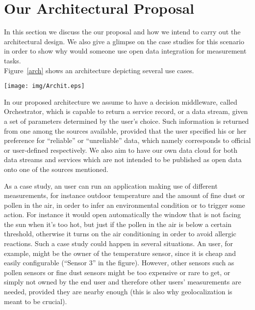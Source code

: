 \section{Our Architectural Proposal}
\label{sec:casestudy}
In this section we discuss the our proposal and how we intend to carry out the architectural design.
We also give a glimpse on the case studies for this scenario in order to show why would someone use open data integration for measurement tasks.
\\
Figure~\ref{arch} shows an architecture depicting several use cases.

\begin{figure*}[!t]
\centering
\texttt{[image: img/Archit.eps]} 
\caption{}
\label{arch}
\end{figure*}

In our proposed architecture we assume to have a decision middleware, called Orchestrator, which is capable to return a service record, or a data stream, given a set of parameters determined by the user's choice.
Such information is returned from one among the sources available, provided that the user specified his or her preference for ``reliable'' or ``unreliable'' data, which namely corresponds to official or user-defined respectively.
We also aim to have our own data cloud for both data streams and services which are not intended to be published as open data onto one of the sources mentioned.

As a case study, an user can run an application making use of different measurements, for instance outdoor temperature and the amount of fine dust or pollen in the air, in order to infer an environmental condition or to trigger some action.
For instance it would open automatically the window that is not facing the sun when it's too hot, but just if the pollen in the air is below a certain threshold, otherwise it turns on the air conditioning in order to avoid allergic reactions.
Such a case study could happen in several situations.
An user, for example, might be the owner of the temperature sensor, since it is cheap and easily configurable (``Sensor 3'' in the figure).
However, other sensors such as pollen sensors or fine dust sensors might be too expensive or rare to get, or simply not owned by the end user and therefore other users' measurements are needed, provided they are nearby enough (this is also why geolocalization is meant to be crucial).

